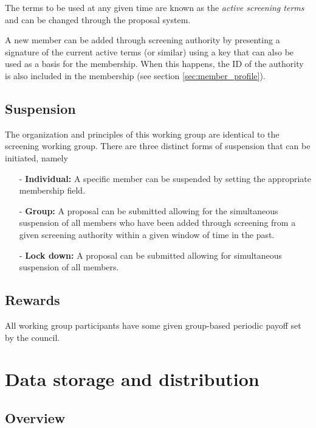 \documentclass{article}
\begin{document}
The terms to be used at any given time are known as the \textit{active screening terms} and can be changed through the proposal system.

A new member can be added through screening authority by presenting a signature of the current active terms (or similar) using a key that can also be used as a basis for the membership. When this happens, the ID of the authority is also included in the membership (see section \ref{sec:member_profile}).

\subsection{Suspension} \label{sec:suspension}

The organization and principles of this working group are identical to the screening working group. There are three distinct forms of suspension that can be initiated, namely

\begin{itemize}
  \item[-] \textbf{Individual:} A specific member can be suspended by setting the appropriate membership field.

  \item[-] \textbf{Group:} A proposal can be submitted allowing for the simultaneous suspension of all members who have been added through screening from a given screening authority within a given window of time in the past.

  \item[-] \textbf{Lock down:} A proposal can be submitted allowing for simultaneous suspension of all members.
\end{itemize}

\subsection{Rewards}

All working group participants have some given group-based periodic payoff set by the council.

\section{Data storage and distribution} \label{sec:data_storage_and_distribution}

\subsection{Overview}
\end{document}

